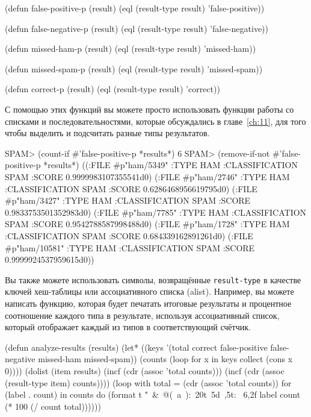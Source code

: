 \begin{myverb}
(defun false-positive-p (result)
  (eql (result-type result) 'false-positive))

(defun false-negative-p (result)
  (eql (result-type result) 'false-negative))

(defun missed-ham-p (result)
  (eql (result-type result) 'missed-ham))

(defun missed-spam-p (result)
  (eql (result-type result) 'missed-spam))

(defun correct-p (result)
  (eql (result-type result) 'correct))
\end{myverb}

С помощью этих функций вы можете просто использовать функции работы со списками и
последовательностями, которые обсуждались в главе~\ref{ch:11}, для того чтобы выделить и
подсчитать разные типы результатов.

\begin{myverb}
SPAM> (count-if #'false-positive-p *results*)
6
SPAM> (remove-if-not #'false-positive-p *results*)
((:FILE #p"ham/5349" :TYPE HAM :CLASSIFICATION SPAM :SCORE 0.9999983107355541d0)
 (:FILE #p"ham/2746" :TYPE HAM :CLASSIFICATION SPAM :SCORE 0.6286468956619795d0)
 (:FILE #p"ham/3427" :TYPE HAM :CLASSIFICATION SPAM :SCORE 0.9833753501352983d0)
 (:FILE #p"ham/7785" :TYPE HAM :CLASSIFICATION SPAM :SCORE 0.9542788587998488d0)
 (:FILE #p"ham/1728" :TYPE HAM :CLASSIFICATION SPAM :SCORE 0.684339162891261d0)
 (:FILE #p"ham/10581" :TYPE HAM :CLASSIFICATION SPAM :SCORE 0.9999924537959615d0))
\end{myverb}

Вы также можете использовать символы, возвращённые \lstinline{result-type} в качестве ключей
хеш-таблицы или ассоциативного списка (alist).  Например, вы можете написать функцию,
которая будет печатать итоговые результаты и процентное соотношение каждого типа в
результате, используя ассоциативный список, который отображает каждый из типов в
соответствующий счётчик.

\begin{myverb}
(defun analyze-results (results)
  (let* ((keys '(total correct false-positive 
                 false-negative missed-ham missed-spam))
         (counts (loop for x in keys collect (cons x 0))))
    (dolist (item results)
      (incf (cdr (assoc 'total counts)))
      (incf (cdr (assoc (result-type item) counts))))
    (loop with total = (cdr (assoc 'total counts))
          for (label . count) in counts
          do (format t "~&~@(~a~):~20t~5d~,5t: ~6,2f%
                     label count (* 100 (/ count total))))))
\end{myverb}

